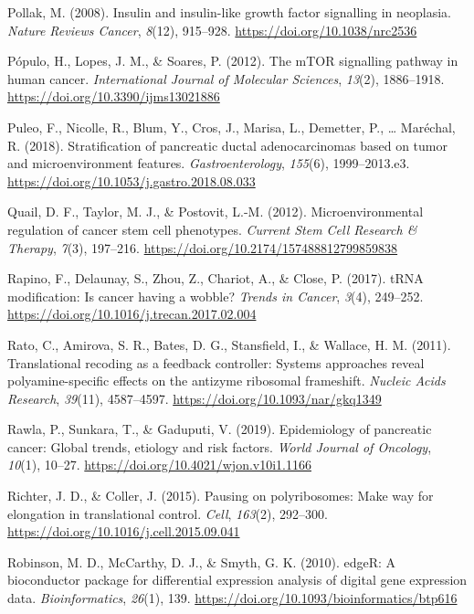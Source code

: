 \documentclass[12pt,openany]{book}
\begin{document}
\hypertarget{ref-Pollak2008}{}
Pollak, M. (2008). Insulin and insulin-like growth factor signalling in
neoplasia. \emph{Nature Reviews Cancer}, \emph{8}(12), 915--928.
\url{https://doi.org/10.1038/nrc2536}

\hypertarget{ref-Populo2012}{}
Pópulo, H., Lopes, J. M., \& Soares, P. (2012). The mTOR signalling
pathway in human cancer. \emph{International Journal of Molecular
Sciences}, \emph{13}(2), 1886--1918.
\url{https://doi.org/10.3390/ijms13021886}

\hypertarget{ref-Puleo2018}{}
Puleo, F., Nicolle, R., Blum, Y., Cros, J., Marisa, L., Demetter, P.,
\ldots{} Maréchal, R. (2018). Stratification of pancreatic ductal
adenocarcinomas based on tumor and microenvironment features.
\emph{Gastroenterology}, \emph{155}(6), 1999--2013.e3.
\url{https://doi.org/10.1053/j.gastro.2018.08.033}

\hypertarget{ref-Quail2012}{}
Quail, D. F., Taylor, M. J., \& Postovit, L.-M. (2012).
Microenvironmental regulation of cancer stem cell phenotypes.
\emph{Current Stem Cell Research \& Therapy}, \emph{7}(3), 197--216.
\url{https://doi.org/10.2174/157488812799859838}

\hypertarget{ref-Rapino2017}{}
Rapino, F., Delaunay, S., Zhou, Z., Chariot, A., \& Close, P. (2017).
tRNA modification: Is cancer having a wobble? \emph{Trends in Cancer},
\emph{3}(4), 249--252.
\url{https://doi.org/10.1016/j.trecan.2017.02.004}

\hypertarget{ref-Rato2011}{}
Rato, C., Amirova, S. R., Bates, D. G., Stansfield, I., \& Wallace, H.
M. (2011). Translational recoding as a feedback controller: Systems
approaches reveal polyamine-specific effects on the antizyme ribosomal
frameshift. \emph{Nucleic Acids Research}, \emph{39}(11), 4587--4597.
\url{https://doi.org/10.1093/nar/gkq1349}

\hypertarget{ref-Rawla2019}{}
Rawla, P., Sunkara, T., \& Gaduputi, V. (2019). Epidemiology of
pancreatic cancer: Global trends, etiology and risk factors. \emph{World
Journal of Oncology}, \emph{10}(1), 10--27.
\url{https://doi.org/10.4021/wjon.v10i1.1166}

\hypertarget{ref-Richter2015}{}
Richter, J. D., \& Coller, J. (2015). Pausing on polyribosomes: Make way
for elongation in translational control. \emph{Cell}, \emph{163}(2),
292--300. \url{https://doi.org/10.1016/j.cell.2015.09.041}

\hypertarget{ref-Robinson2010}{}
Robinson, M. D., McCarthy, D. J., \& Smyth, G. K. (2010). edgeR: A
bioconductor package for differential expression analysis of digital
gene expression data. \emph{Bioinformatics}, \emph{26}(1), 139.
\url{https://doi.org/10.1093/bioinformatics/btp616}
\end{document}
